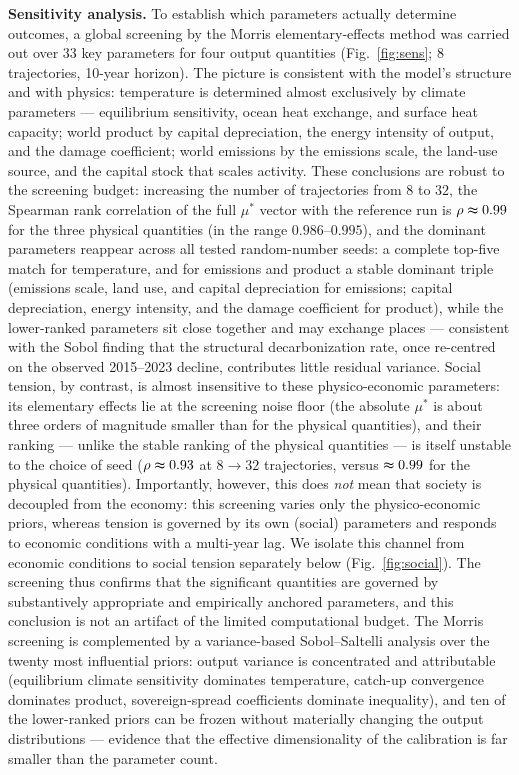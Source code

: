 \documentclass[a4paper,fleqn]{cas-sc}
\begin{document}
\textbf{Sensitivity analysis.} To establish which parameters actually determine outcomes, a global
screening by the Morris elementary-effects method \citep{morris1991,campolongo2007} was carried out
over 33 key parameters for four output quantities (Fig.~\ref{fig:sens}; $8$ trajectories, 10-year
horizon). The picture is consistent with the model's structure and with physics: temperature is
determined almost exclusively by climate parameters --- equilibrium sensitivity, ocean heat
exchange, and surface heat capacity; world product by capital depreciation, the energy intensity of output,
and the damage coefficient; world emissions by the emissions scale, the land-use source, and the
capital stock that scales activity. These conclusions are robust to the screening budget: increasing the
number of trajectories from $8$ to $32$, the Spearman rank correlation of the full $\mu^*$ vector
with the reference run is $\rho\thickapprox0.99$ for the three physical quantities (in the range
$0.986$--$0.995$), and the dominant parameters reappear across all tested random-number seeds: a
complete top-five match for temperature, and for emissions and product a stable dominant triple
(emissions scale, land use, and capital depreciation for emissions; capital depreciation, energy
intensity, and the damage coefficient for product), while the lower-ranked parameters sit close
together and may exchange places --- consistent with the Sobol finding that the structural
decarbonization rate, once re-centred on the observed 2015--2023 decline, contributes little
residual variance. Social tension, by contrast, is almost insensitive to these physico-economic
parameters: its elementary effects lie at the screening noise floor (the absolute $\mu^*$ is about
three orders of magnitude smaller than for the physical quantities), and their ranking --- unlike the
stable ranking of the physical quantities --- is itself unstable to the choice of seed
($\rho\thickapprox0.93$ at $8\!\to\!32$ trajectories, versus $\thickapprox0.99$ for the physical quantities). Importantly,
however, this does \emph{not} mean that society is decoupled from the economy: this screening varies
only the physico-economic priors, whereas tension is governed by its own (social) parameters and
responds to economic conditions with a multi-year lag. We isolate this channel from economic
conditions to social tension separately below (Fig.~\ref{fig:social}). The screening thus confirms
that the significant quantities are governed by substantively appropriate and empirically anchored
parameters, and this conclusion is not an artifact of the limited computational budget. The Morris
screening is complemented by a variance-based Sobol--Saltelli analysis over the twenty most
influential priors: output variance is concentrated and attributable (equilibrium climate
sensitivity dominates temperature, catch-up convergence dominates product, sovereign-spread
coefficients dominate inequality), and ten of the lower-ranked priors can be frozen without
materially changing the output distributions --- evidence that the effective dimensionality of the
calibration is far smaller than the parameter count.
\end{document}
